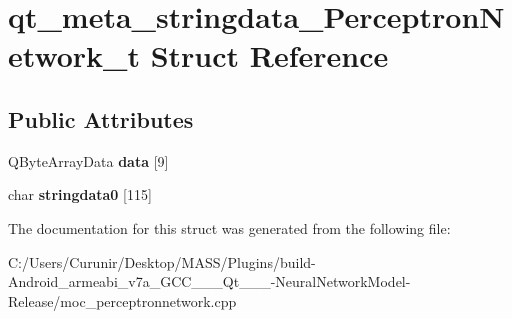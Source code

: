\hypertarget{structqt__meta__stringdata___perceptron_network__t}{}\section{qt\+\_\+meta\+\_\+stringdata\+\_\+\+Perceptron\+Network\+\_\+t Struct Reference}
\label{structqt__meta__stringdata___perceptron_network__t}
\subsection*{Public Attributes}
\begin{DoxyCompactItemize}
\item 
\mbox{\label{structqt__meta__stringdata___perceptron_network__t_a45bba994d12be1e0a8b708a7529447e3}} 
Q\+Byte\+Array\+Data {\bfseries data} \mbox{[}9\mbox{]}
\item 
\mbox{\label{structqt__meta__stringdata___perceptron_network__t_a7b3ce079e27060ae3022f350f2285a3b}} 
char {\bfseries stringdata0} \mbox{[}115\mbox{]}
\end{DoxyCompactItemize}


The documentation for this struct was generated from the following file\+:\begin{DoxyCompactItemize}
\item 
C\+:/\+Users/\+Curunir/\+Desktop/\+M\+A\+S\+S/\+Plugins/build-\/\+Android\+\_\+armeabi\+\_\+v7a\+\_\+\+G\+C\+C\+\_\+\_\+\_\+\+Qt\+\_\+\_\+\_-\/\+Neural\+Network\+Model-\/\+Release/moc\+\_\+perceptronnetwork.\+cpp\end{DoxyCompactItemize}

